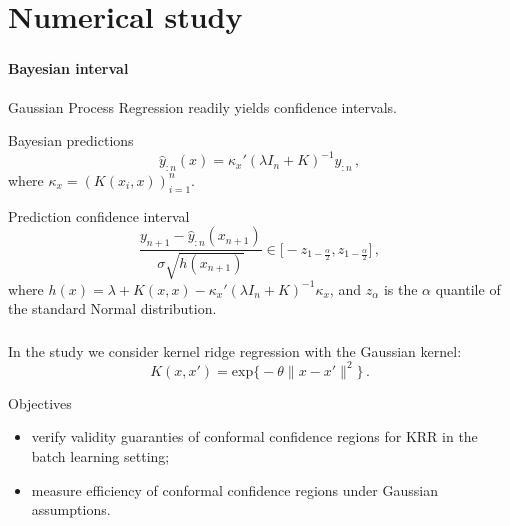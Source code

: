 \documentclass[t]{beamer}  %
\begin{document}


\section{Numerical study} %
\label{sec:Numerical_study}

\begin{frame}[c]\frametitle{\insertsection}
  \framesubtitle{Bayesian interval}
  Gaussian Process Regression readily yields confidence intervals.
  \vspace{\baselineskip}
  \begin{block}{Bayesian predictions}
    $$ \hat{y}_{:n}(x) = \kappa_x' (\lambda I_n + K)^{-1} y_{:n} \,, $$
    where $\kappa_x = (K(x_i, x))_{i=1}^n$.
  \end{block}

  \begin{block}{Prediction confidence interval}
    $$ \frac{y_{n+1} - \hat{y}_{:n}(x_{n+1})}{\sigma \sqrt{h(x_{n+1})}} \in
      \bigl[- z_{1-\frac{\alpha}{2}}, z_{1-\frac{\alpha}{2}} \bigr] \,, $$
    where $ h(x) = \lambda + K(x,x) - \kappa_x' (\lambda I_n + K)^{-1} \kappa_x$,
    and $z_\alpha$ is the $\alpha$ quantile of the standard Normal distribution.
  \end{block}
\end{frame}

\begin{frame}[c]\frametitle{\insertsection}
  In the study we consider kernel ridge regression with the Gaussian kernel:
  $$ K(x,x') = \text{exp}\bigl\{ -\theta \|x-x'\|^2 \bigr\} \,. $$
  \begin{block}{Objectives}
    \begin{itemize}
      \item verify validity guaranties of conformal confidence regions for KRR in
      the batch learning setting;
      \item measure efficiency of conformal confidence regions under Gaussian
      assumptions.
    \end{itemize}
  \end{block}
\end{frame}
\end{document}
